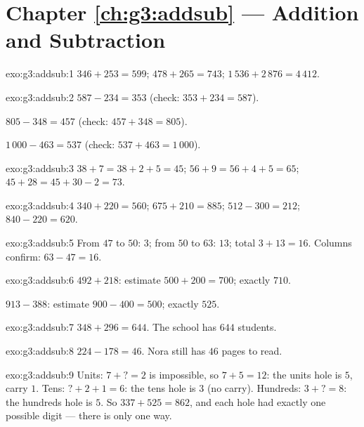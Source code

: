 \section*{Chapter \ref{ch:g3:addsub} --- Addition and Subtraction}

\begin{solution}{exo:g3:addsub:1}
$346 + 253 = 599$; \quad
$478 + 265 = 743$; \quad
$1\,536 + 2\,876 = 4\,412$.
\end{solution}

\begin{solution}{exo:g3:addsub:2}
$587 - 234 = 353$ (check: $353 + 234 = 587$).

$805 - 348 = 457$ (check: $457 + 348 = 805$).

$1\,000 - 463 = 537$ (check: $537 + 463 = 1\,000$).
\end{solution}

\begin{solution}{exo:g3:addsub:3}
$38 + 7 = 38 + 2 + 5 = 45$; \quad
$56 + 9 = 56 + 4 + 5 = 65$; \quad
$45 + 28 = 45 + 30 - 2 = 73$.
\end{solution}

\begin{solution}{exo:g3:addsub:4}
$340 + 220 = 560$; \quad $675 + 210 = 885$; \quad
$512 - 300 = 212$; \quad $840 - 220 = 620$.
\end{solution}

\begin{solution}{exo:g3:addsub:5}
From $47$ to $50$: $3$; from $50$ to $63$: $13$; total
$3 + 13 = 16$. Columns confirm: $63 - 47 = 16$.
\end{solution}

\begin{solution}{exo:g3:addsub:6}
$492 + 218$: estimate $500 + 200 = 700$; exactly $710$.

$913 - 388$: estimate $900 - 400 = 500$; exactly $525$.
\end{solution}

\begin{solution}{exo:g3:addsub:7}
$348 + 296 = 644$. The school has $644$ students.
\end{solution}

\begin{solution}{exo:g3:addsub:8}
$224 - 178 = 46$. Nora still has $46$ pages to read.
\end{solution}

\begin{solution}{exo:g3:addsub:9}
Units: $7 + \text{?} = 2$ is impossible, so $7 + 5 = 12$: the units
hole is $5$, carry $1$. Tens: $\text{?} + 2 + 1 = 6$: the tens hole
is $3$ (no carry). Hundreds: $3 + \text{?} = 8$: the hundreds hole is
$5$. So $337 + 525 = 862$, and each hole had exactly one possible
digit --- there is only one way.
\end{solution}

